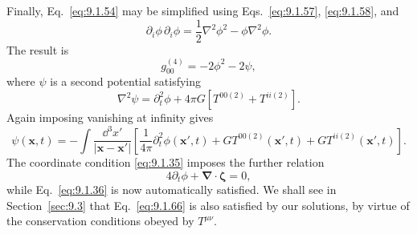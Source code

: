 Finally, Eq.~\eqref{eq:9.1.54} may be simplified using
Eqs.~\eqref{eq:9.1.57}, \eqref{eq:9.1.58}, and
\[
  \partial_i\phi\,\partial_i\phi
  =\frac12\nabla^2\phi^2-\phi\nabla^2\phi.
\]
The result is
\begin{equation}
  g_{00}^{(4)}=-2\phi^2-2\psi,
  \tag{9.1.63}\label{eq:9.1.63}
\end{equation}
where \(\psi\) is a second potential satisfying
\begin{equation}
  \nabla^2\psi
  =
  \partial_t^2\phi
  +4\pi G\left[T^{00(2)}+T^{ii(2)}\right].
  \tag{9.1.64}\label{eq:9.1.64}
\end{equation}
Again imposing vanishing at infinity gives
\begin{equation}
  \psi(\mathbf x,t)
  =
  -\int\frac{\dd^3x'}{|\mathbf x-\mathbf x'|}
  \left[
    \frac1{4\pi}\partial_t^2\phi(\mathbf x',t)
    +G T^{00(2)}(\mathbf x',t)
    +G T^{ii(2)}(\mathbf x',t)
  \right].
  \tag{9.1.65}\label{eq:9.1.65}
\end{equation}
The coordinate condition \eqref{eq:9.1.35} imposes the further relation
\begin{equation}
  4\partial_t\phi+\boldsymbol\nabla\cdot\boldsymbol\zeta=0,
  \tag{9.1.66}\label{eq:9.1.66}
\end{equation}
while Eq.~\eqref{eq:9.1.36} is now automatically satisfied. We shall see
in Section~\ref{sec:9.3} that Eq.~\eqref{eq:9.1.66} is also satisfied by
our solutions, by virtue of the conservation conditions obeyed by
\(T^{\mu\nu}\).

